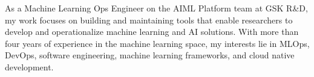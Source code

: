

\begin{cvparagraph}

As a Machine Learning Ops Engineer on the AIML Platform team at GSK R\&D, my work focuses on building and maintaining tools that enable researchers to develop and operationalize machine learning and AI solutions. With more than four years of experience in the machine learning space, my interests lie in MLOps, DevOps, software engineering, machine learning frameworks, and cloud native development.


\end{cvparagraph}
